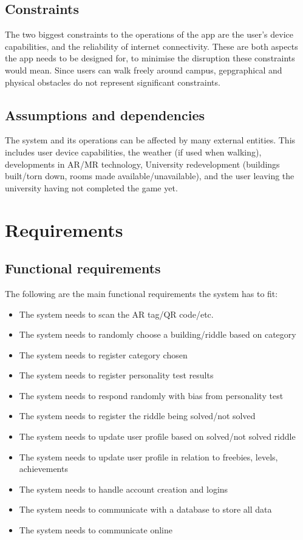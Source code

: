 \documentclass[a4,10pt,twocolumn]{article}
\begin{document}
\subsection*{Constraints}
The two biggest constraints to the operations of the app are the user's device capabilities, and the reliability of internet connectivity. These are both aspects the app needs to be designed for, to minimise the disruption these constraints would mean. Since users can walk freely around campus, gepgraphical and physical obstacles do not represent significant constraints.

\subsection*{Assumptions and dependencies}
The system and its operations can be affected by many external entities. This includes user device capabilities, the weather (if used when walking), developments in AR/MR technology, University redevelopment (buildings built/torn down, rooms made available/unavailable), and the user leaving the university having not completed the game yet.

\section*{Requirements}

\subsection*{Functional requirements}
The following are the main functional requirements the system has to fit:
\begin{itemize}
  \item The system needs to scan the AR tag/QR code/etc.
  \item The system needs to randomly choose a building/riddle based on category
  \item The system needs to register category chosen
  \item The system needs to register personality test results
  \item The system needs to respond randomly with bias from personality test
  \item The system needs to register the riddle being solved/not solved
  \item The system needs to update user profile based on solved/not solved riddle
  \item The system needs to update user profile in relation to freebies, levels, achievements
  \item The system needs to handle account creation and logins
  \item The system needs to communicate with a database to store all data
  \item The system needs to communicate online
\end{itemize}
\end{document}
